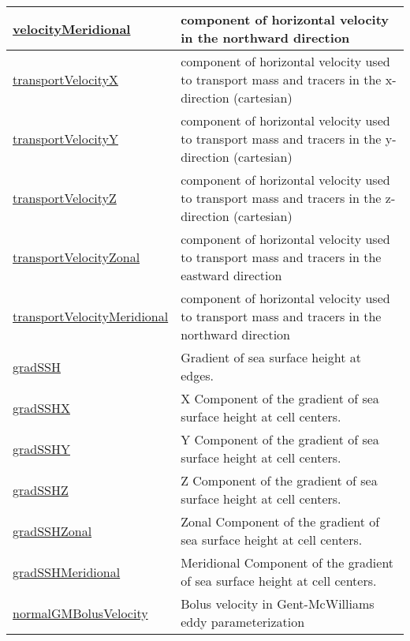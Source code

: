 {\begin{center}
\begin{longtable}{| p{2.0in} | p{4.0in} |}
    \hline
    \hyperref[subsec:var_sec_diagnostics_velocityMeridional]{velocityMeridional} & component of horizontal velocity in the northward direction \\
    \hline
    \hyperref[subsec:var_sec_diagnostics_transportVelocityX]{transportVelocityX} & component of horizontal velocity used to transport mass and tracers in the x-direction (cartesian) \\
    \hline
    \hyperref[subsec:var_sec_diagnostics_transportVelocityY]{transportVelocityY} & component of horizontal velocity used to transport mass and tracers in the y-direction (cartesian) \\
    \hline
    \hyperref[subsec:var_sec_diagnostics_transportVelocityZ]{transportVelocityZ} & component of horizontal velocity used to transport mass and tracers in the z-direction (cartesian) \\
    \hline
    \hyperref[subsec:var_sec_diagnostics_transportVelocityZonal]{transportVelocityZonal} & component of horizontal velocity used to transport mass and tracers in the eastward direction \\
    \hline
    \hyperref[subsec:var_sec_diagnostics_transportVelocityMeridional]{transportVelocityMeridional} & component of horizontal velocity used to transport mass and tracers in the northward direction \\
    \hline
    \hyperref[subsec:var_sec_diagnostics_gradSSH]{gradSSH} & Gradient of sea surface height at edges. \\
    \hline
    \hyperref[subsec:var_sec_diagnostics_gradSSHX]{gradSSHX} & X Component of the gradient of sea surface height at cell centers. \\
    \hline
    \hyperref[subsec:var_sec_diagnostics_gradSSHY]{gradSSHY} & Y Component of the gradient of sea surface height at cell centers. \\
    \hline
    \hyperref[subsec:var_sec_diagnostics_gradSSHZ]{gradSSHZ} & Z Component of the gradient of sea surface height at cell centers. \\
    \hline
    \hyperref[subsec:var_sec_diagnostics_gradSSHZonal]{gradSSHZonal} & Zonal Component of the gradient of sea surface height at cell centers. \\
    \hline
    \hyperref[subsec:var_sec_diagnostics_gradSSHMeridional]{gradSSHMeridional} & Meridional Component of the gradient of sea surface height at cell centers. \\
    \hline
    \hyperref[subsec:var_sec_diagnostics_normalGMBolusVelocity]{normalGMBolusVelocity} & Bolus velocity in Gent-McWilliams eddy parameterization \\

\end{longtable}
\end{center}}
